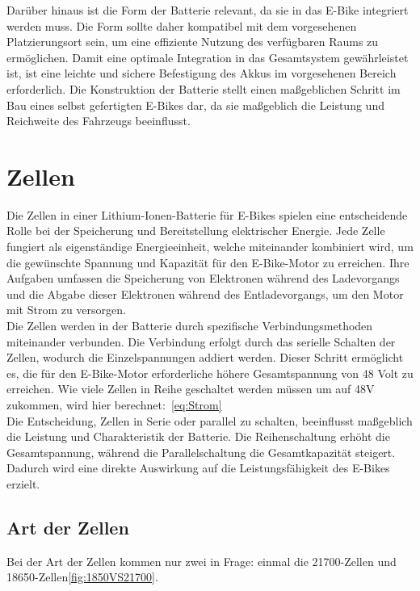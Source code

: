 Darüber hinaus ist die Form der Batterie relevant, da sie in das E-Bike integriert werden muss.
Die Form sollte daher kompatibel mit dem vorgesehenen Platzierungsort sein, um eine effiziente Nutzung des verfügbaren Raums zu ermöglichen.
Damit eine optimale Integration in das Gesamtsystem gewährleistet ist, ist eine leichte und sichere Befestigung des Akkus im vorgesehenen Bereich erforderlich.
Die Konstruktion der Batterie stellt einen maßgeblichen Schritt im Bau eines selbst gefertigten E-Bikes dar, da sie maßgeblich die Leistung und Reichweite des Fahrzeugs beeinflusst.


\section{Zellen}
Die Zellen in einer Lithium-Ionen-Batterie für E-Bikes spielen eine entscheidende Rolle bei der Speicherung und Bereitstellung elektrischer Energie.
Jede Zelle fungiert als eigenständige Energieeinheit, welche miteinander kombiniert wird, um die gewünschte Spannung und Kapazität für den E-Bike-Motor zu erreichen.
Ihre Aufgaben umfassen die Speicherung von Elektronen während des Ladevorgangs und die Abgabe dieser Elektronen während des Entladevorgangs, um den Motor mit Strom zu versorgen.\\

Die Zellen werden in der Batterie durch spezifische Verbindungsmethoden miteinander verbunden.
Die Verbindung erfolgt durch das serielle Schalten der Zellen, wodurch die Einzelspannungen addiert werden.
Dieser Schritt ermöglicht es, die für den E-Bike-Motor erforderliche höhere Gesamtspannung von 48 Volt zu erreichen.
Wie viele Zellen in Reihe geschaltet werden müssen um auf 48V zukommen, wird hier berechnet:~\ref{eq:Strom}\\
Die Entscheidung, Zellen in Serie oder parallel zu schalten, beeinflusst maßgeblich die Leistung und Charakteristik der Batterie.
Die Reihenschaltung erhöht die Gesamtspannung, während die Parallelschaltung die Gesamtkapazität steigert.
Dadurch wird eine direkte Auswirkung auf die Leistungsfähigkeit des E-Bikes erzielt.\\

\subsection{Art der Zellen}
Bei der Art der Zellen kommen nur zwei in Frage: einmal die 21700-Zellen und 18650-Zellen\ref{fig:1850VS21700}.


